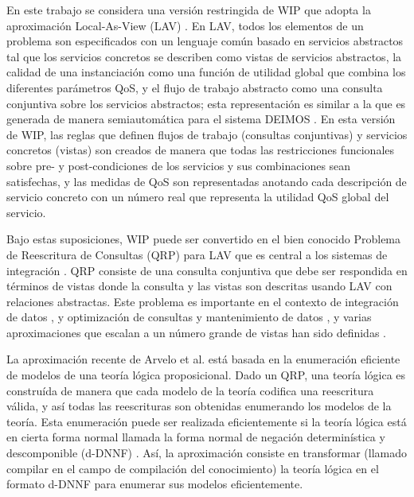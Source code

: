 En este trabajo se considera una versión restringida de WIP que adopta la
aproximación Local-As-View (LAV) \cite{levy:bucket}. En LAV, todos los elementos de un
problema son especificados con un lenguaje común basado en servicios abstractos
tal que los servicios concretos se describen como vistas de servicios
abstractos, la calidad de una instanciación como una función de utilidad global
que combina los diferentes parámetros QoS, y el flujo de trabajo abstracto como
una consulta conjuntiva sobre los servicios abstractos; esta representación es
similar a la que es generada de manera semiautomática para el sistema DEIMOS
\cite{AmbiteISWC09}. En esta versión de WIP, las reglas que definen flujos de trabajo
(consultas conjuntivas) y servicios concretos (vistas) son creados de manera que
todas las restricciones funcionales sobre pre- y post-condiciones de los
servicios y sus combinaciones sean satisfechas, y las medidas de QoS son
representadas anotando cada descripción de servicio concreto con un número real
que representa la utilidad QoS global del servicio.

Bajo estas suposiciones, WIP puede ser convertido en el bien conocido Problema
de Reescritura de Consultas (QRP) para LAV que es central a los sistemas de
integración \cite{halevy:survey}. QRP consiste de una consulta conjuntiva que debe ser
respondida en términos de vistas donde la consulta y las vistas son descritas
usando LAV con relaciones abstractas. Este problema es importante en el contexto
de integración de datos \cite{Chen05,JaudoinPRST05}, y optimización de consultas y mantenimiento
de datos \cite{AfratiLU07,levy:bucket}, y varias aproximaciones que escalan a un número grande de
vistas han sido definidas \cite{arvelo:aaai06,pods:DuschkaG97,sac:DuschkaG97,levy:bucket,pottinger:minicon}.

La aproximación recente de Arvelo et al. \cite{arvelo:aaai06} está basada en la enumeración
eficiente de modelos de una teoría lógica proposicional. Dado un QRP, una teoría
lógica es construída de manera que cada modelo de la teoría codifica una
reescritura válida, y así todas las reescrituras son obtenidas enumerando los
modelos de la teoría. Esta enumeración puede ser realizada eficientemente si la
teoría lógica está en cierta forma normal llamada la forma normal de negación
determinística y descomponible (d-DNNF) \cite{darwiche:d-dnnfs}. Así,
la aproximación consiste en transformar (llamado compilar en el campo de
compilación del conocimiento) la teoría lógica en el formato d-DNNF para
enumerar sus modelos eficientemente.

